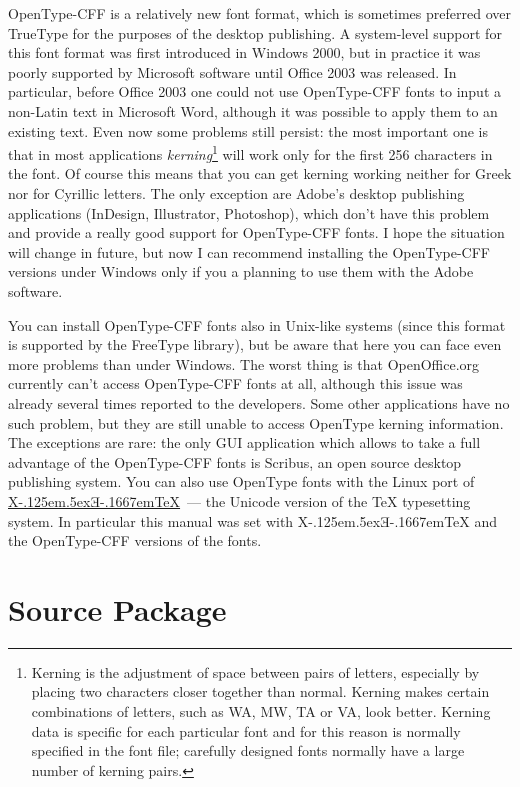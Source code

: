 \documentclass[12pt,a4paper,openany]{book}
\providecommand{\XeTeX}{X\kern-.125em\lower.5ex\hbox{Ǝ}\kern-.1667em\TeX}
\begin{document}
OpenType-CFF is a relatively new font format, which is sometimes preferred
over TrueType for the purposes of the desktop publishing. A system-level
support for this font format was first introduced in Windows 2000, but in
practice it was poorly supported by Microsoft software until Office 2003
was released. In particular, before Office 2003 one could not use
OpenType-CFF fonts to input a non-Latin text in Microsoft Word, although it
was possible to apply them to an existing text. Even now some problems
still persist: the most important one is that in most applications
\textit{kerning}\footnote{Kerning is the adjustment of space between pairs
of letters, especially by placing two characters closer together than
normal. Kerning makes certain combinations of letters, such as WA, MW, TA
or VA, look better. Kerning data is specific for each particular font and
for this reason is normally specified in the font file; carefully designed
fonts normally have a large number of kerning pairs.} will work only for
the first 256 characters in the font. Of course this means that you can get
kerning working neither for Greek nor for Cyrillic letters. The only
exception are Adobe’s desktop publishing applications (InDesign,
Illustrator, Photoshop), which don’t have this problem and provide a really
good support for OpenType-CFF fonts. I hope the situation will change in
future, but now I can recommend installing the OpenType-CFF versions under
Windows only if you a planning to use them with the Adobe software.

You can install OpenType-CFF fonts also in Unix-like systems (since this
format is supported by the FreeType library), but be aware that here you
can face even more problems than under Windows. The worst thing is that
OpenOffice.org currently can’t access OpenType-CFF fonts at all, although
this issue was already several times reported to the developers.  Some
other applications have no such problem, but they are still unable to
access OpenType kerning information. The exceptions are rare: the only GUI
application which allows to take a full advantage of the OpenType-CFF fonts
is Scribus, an open source desktop publishing system. You can also use
OpenType fonts with the Linux port of
\href{http://scripts.sil.org/xetex}{\XeTeX}~— the Unicode version of the
\TeX{} typesetting system. In particular this manual was set with \XeTeX{}
and the OpenType-CFF versions of the fonts.

\section{Source Package}
\end{document}
